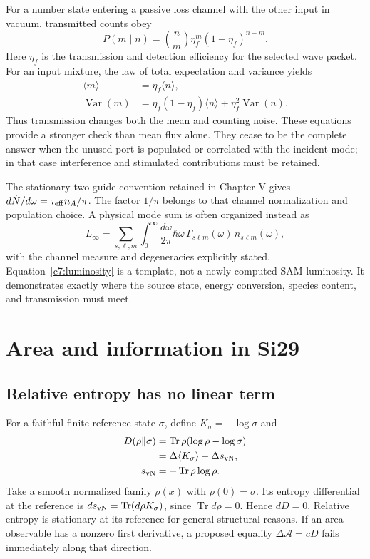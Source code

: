 For a number state entering a passive loss channel with the other input in vacuum, transmitted counts obey
\begin{equation}
 P(m\mid n)=\binom nm\eta_f^m(1-\eta_f)^{n-m}.
 \label{c7:binomial}
\end{equation}
Here $\eta_f$ is the transmission and detection efficiency for the selected wave packet. For an input mixture, the law of total expectation and variance yields
\begin{align}
 \langle m\rangle&=\eta_f\langle n\rangle,\label{c7:countmean}\\
 \operatorname{Var}(m)&=\eta_f(1-\eta_f)\langle n\rangle
                 +\eta_f^2\operatorname{Var}(n).\label{c7:countvar}
\end{align}
Thus transmission changes both the mean and counting noise. These equations provide a stronger check than mean flux alone. They cease to be the complete answer when the unused port is populated or correlated with the incident mode; in that case interference and stimulated contributions must be retained.

The stationary two-guide convention retained in Chapter V gives $d\dot N/d\omega=\tau_{\rm eff}n_A/\pi$. The factor $1/\pi$ belongs to that channel normalization and population choice. A physical mode sum is often organized instead as
\begin{equation}
 L_\infty=\sum_{s,\ell,m}\int_0^\infty\frac{d\omega}{2\pi}
 \hbar\omega\,\Gamma_{s\ell m}(\omega)\,n_{s\ell m}(\omega),
 \label{c7:luminosity}
\end{equation}
with the channel measure and degeneracies explicitly stated. Equation~\eqref{c7:luminosity} is a template, not a newly computed SAM luminosity. It demonstrates exactly where the source state, energy conversion, species content, and transmission must meet.

\section{Area and information in Si29}
\subsection{Relative entropy has no linear term}
For a faithful finite reference state $\sigma$, define $K_\sigma=-\log\sigma$ and
\begin{equation}
 \begin{aligned}
 D(\rho\Vert\sigma)&=\operatorname{Tr}\rho(\log\rho-\log\sigma)\\
 &=\Delta\langle K_\sigma\rangle-\Delta s_{\rm vN},\\
 s_{\rm vN}&=-\operatorname{Tr}\rho\log\rho.
 \end{aligned}
 \label{c7:relative}
\end{equation}
Take a smooth normalized family $\rho(x)$ with $\rho(0)=\sigma$. Its entropy differential at the reference is $ds_{\rm vN}=\operatorname{Tr}(d\rho K_\sigma)$, since $\operatorname{Tr}d\rho=0$. Hence $dD=0$. Relative entropy is stationary at its reference for general structural reasons. If an area observable has a nonzero first derivative, a proposed equality $\Delta\overline{\mathcal A}=cD$ fails immediately along that direction.


